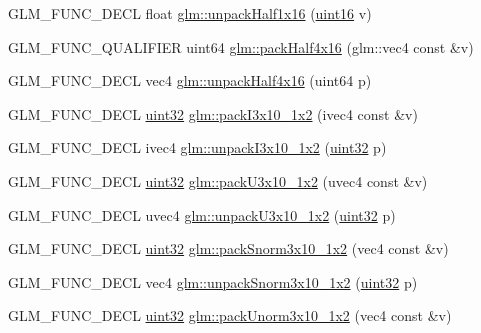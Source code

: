 \begin{DoxyCompactItemize}
\item 
G\+L\+M\+\_\+\+F\+U\+N\+C\+\_\+\+D\+E\+C\+L float \hyperlink{group__gtc__packing_gaa6eebcdfc746584b7d1823f1d5344fed}{glm\+::unpack\+Half1x16} (\hyperlink{stb__image_8c_a05f6b0ae8f6a6e135b0e290c25fe0e4e}{uint16} v)
\item 
G\+L\+M\+\_\+\+F\+U\+N\+C\+\_\+\+Q\+U\+A\+L\+I\+F\+I\+E\+R uint64 \hyperlink{namespaceglm_a670e1c579209ce012e384819ceb829b6}{glm\+::pack\+Half4x16} (glm\+::vec4 const \&v)
\item 
G\+L\+M\+\_\+\+F\+U\+N\+C\+\_\+\+D\+E\+C\+L vec4 \hyperlink{group__gtc__packing_gaea526d6491ad40401eac34803984bf27}{glm\+::unpack\+Half4x16} (uint64 p)
\item 
G\+L\+M\+\_\+\+F\+U\+N\+C\+\_\+\+D\+E\+C\+L \hyperlink{stb__image_8c_a1134b580f8da4de94ca6b1de4d37975e}{uint32} \hyperlink{group__gtc__packing_ga032e18fa5bc5b8f3897104aeb2f1e195}{glm\+::pack\+I3x10\+\_\+1x2} (ivec4 const \&v)
\item 
G\+L\+M\+\_\+\+F\+U\+N\+C\+\_\+\+D\+E\+C\+L ivec4 \hyperlink{group__gtc__packing_ga08bcd34cf9c34701d658dd861ee6e300}{glm\+::unpack\+I3x10\+\_\+1x2} (\hyperlink{stb__image_8c_a1134b580f8da4de94ca6b1de4d37975e}{uint32} p)
\item 
G\+L\+M\+\_\+\+F\+U\+N\+C\+\_\+\+D\+E\+C\+L \hyperlink{stb__image_8c_a1134b580f8da4de94ca6b1de4d37975e}{uint32} \hyperlink{group__gtc__packing_gaf656d8862628f96b20de7a36eaa1fe56}{glm\+::pack\+U3x10\+\_\+1x2} (uvec4 const \&v)
\item 
G\+L\+M\+\_\+\+F\+U\+N\+C\+\_\+\+D\+E\+C\+L uvec4 \hyperlink{group__gtc__packing_ga119aa2d7d55952f9dc4214390a6ffefc}{glm\+::unpack\+U3x10\+\_\+1x2} (\hyperlink{stb__image_8c_a1134b580f8da4de94ca6b1de4d37975e}{uint32} p)
\item 
G\+L\+M\+\_\+\+F\+U\+N\+C\+\_\+\+D\+E\+C\+L \hyperlink{stb__image_8c_a1134b580f8da4de94ca6b1de4d37975e}{uint32} \hyperlink{group__gtc__packing_ga0d4157cec37c0312216a7be1cc92df54}{glm\+::pack\+Snorm3x10\+\_\+1x2} (vec4 const \&v)
\item 
G\+L\+M\+\_\+\+F\+U\+N\+C\+\_\+\+D\+E\+C\+L vec4 \hyperlink{group__gtc__packing_ga8b8bb827a3743ca553d8702d3e337101}{glm\+::unpack\+Snorm3x10\+\_\+1x2} (\hyperlink{stb__image_8c_a1134b580f8da4de94ca6b1de4d37975e}{uint32} p)
\item 
G\+L\+M\+\_\+\+F\+U\+N\+C\+\_\+\+D\+E\+C\+L \hyperlink{stb__image_8c_a1134b580f8da4de94ca6b1de4d37975e}{uint32} \hyperlink{group__gtc__packing_ga2cf2d11b40bd48639110456fd74c2e33}{glm\+::pack\+Unorm3x10\+\_\+1x2} (vec4 const \&v)
\item 

\end{DoxyCompactItemize}
